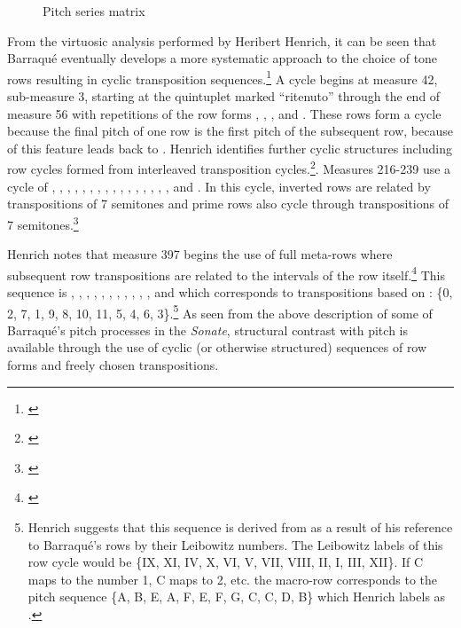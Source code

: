 \begin{figure}[p]
    \caption{Pitch series matrix}
    \label{fig:matrix-a}
\end{figure}

From the virtuosic analysis performed by Heribert Henrich, it can be seen that Barraqué eventually develops a more systematic approach to the choice of tone rows resulting in cyclic transposition sequences.\footnote{\citet[48]{barraque-werk}} A cycle begins at measure 42, sub-measure 3, starting at the quintuplet marked ``ritenuto'' through the end of measure 56 with repetitions of the row forms , , , and . These rows form a cycle because the final pitch of one row is the first pitch of the subsequent row, because of this feature  leads back to . Henrich identifies further cyclic structures including row cycles formed from interleaved transposition cycles.\footnote{\citet[49]{barraque-werk}}. Measures 216-239 use a cycle of , , , , , , , , , , , , , , , , and . In this cycle, inverted rows are related by transpositions of 7 semitones and prime rows also cycle through transpositions of 7 semitones.\footnote{\citet[49]{barraque-werk}}

Henrich notes that measure 397 begins the use of full meta-rows where subsequent row transpositions are related to the intervals of the row itself.\footnote{\citet[50]{barraque-werk}} This sequence is , , , , , , , , , , , and  which corresponds to transpositions based on : \{0, 2, 7, 1, 9, 8, 10, 11, 5, 4, 6, 3\}.\footnote{Henrich suggests that this sequence is derived from  as a result of his reference to Barraqué's rows by their Leibowitz numbers. The Leibowitz labels of this row cycle would be \{IX, XI, IV, X, VI, V, VII, VIII, II, I, III, XII\}. If C\mynatural \hspace{0.5mm} maps to the number 1, C\mysharp \hspace{0.5mm} maps to 2, etc. the macro-row corresponds to the pitch sequence \{A\myflat, B\myflat, E\myflat, A\mynatural, F\mynatural, E\mynatural, F\mysharp, G\mynatural, C\mysharp, C\mynatural, D\mynatural, B\mynatural\} which Henrich labels as .} As seen from the above description of some of Barraqué's pitch processes in the \textit{Sonate}, structural contrast with pitch is available through the use of cyclic (or otherwise structured) sequences of row forms and freely chosen transpositions.

